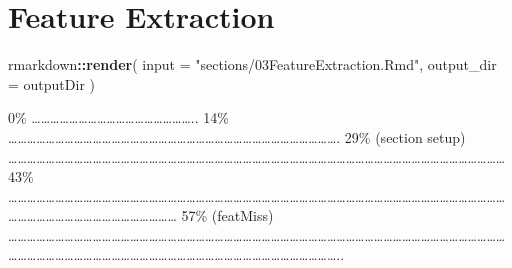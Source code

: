\documentclass[
]{article}
\newenvironment{Shaded}{\begin{snugshade}}{\end{snugshade}}
\newcommand{\AttributeTok}[1]{\textcolor[rgb]{0.13,0.29,0.53}{#1}}
\newcommand{\FunctionTok}[1]{\textcolor[rgb]{0.13,0.29,0.53}{\textbf{#1}}}
\newcommand{\NormalTok}[1]{#1}
\newcommand{\SpecialCharTok}[1]{\textcolor[rgb]{0.81,0.36,0.00}{\textbf{#1}}}
\newcommand{\StringTok}[1]{\textcolor[rgb]{0.31,0.60,0.02}{#1}}
\begin{document}
\hypertarget{feature-extraction}{%
\section{Feature Extraction}\label{feature-extraction}}

\begin{Shaded}
\begin{Highlighting}[]
\NormalTok{rmarkdown}\SpecialCharTok{::}\FunctionTok{render}\NormalTok{(}
  \AttributeTok{input =} \StringTok{"sections/03FeatureExtraction.Rmd"}\NormalTok{,}
  \AttributeTok{output\_dir =}\NormalTok{ outputDir}
\NormalTok{)}
\end{Highlighting}
\end{Shaded}

\textbar{} \textbar{} \textbar{} 0\% \textbar{}
\textbar\ldots\ldots\ldots\ldots\ldots\ldots\ldots\ldots\ldots\ldots\ldots\ldots\ldots\ldots\ldots\ldots\ldots..
\textbar{} 14\% \textbar{}
\textbar\ldots\ldots\ldots\ldots\ldots\ldots\ldots\ldots\ldots\ldots\ldots\ldots\ldots\ldots\ldots\ldots\ldots\ldots\ldots\ldots\ldots\ldots\ldots\ldots\ldots\ldots\ldots\ldots\ldots\ldots\ldots\ldots\ldots\ldots\ldots.
\textbar{} 29\% (section setup) \textbar{}
\textbar\ldots\ldots\ldots\ldots\ldots\ldots\ldots\ldots\ldots\ldots\ldots\ldots\ldots\ldots\ldots\ldots\ldots\ldots\ldots\ldots\ldots\ldots\ldots\ldots\ldots\ldots\ldots\ldots\ldots\ldots\ldots\ldots\ldots\ldots\ldots\ldots\ldots\ldots\ldots\ldots\ldots\ldots\ldots\ldots\ldots\ldots\ldots\ldots\ldots\ldots\ldots\ldots\ldots{}
\textbar{} 43\% \textbar{}
\textbar\ldots\ldots\ldots\ldots\ldots\ldots\ldots\ldots\ldots\ldots\ldots\ldots\ldots\ldots\ldots\ldots\ldots\ldots\ldots\ldots\ldots\ldots\ldots\ldots\ldots\ldots\ldots\ldots\ldots\ldots\ldots\ldots\ldots\ldots\ldots\ldots\ldots\ldots\ldots\ldots\ldots\ldots\ldots\ldots\ldots\ldots\ldots\ldots\ldots\ldots\ldots\ldots\ldots\ldots\ldots\ldots\ldots\ldots\ldots\ldots\ldots\ldots\ldots\ldots\ldots\ldots\ldots\ldots\ldots\ldots\ldots{}
\textbar{} 57\% (featMiss) \textbar{}
\textbar\ldots\ldots\ldots\ldots\ldots\ldots\ldots\ldots\ldots\ldots\ldots\ldots\ldots\ldots\ldots\ldots\ldots\ldots\ldots\ldots\ldots\ldots\ldots\ldots\ldots\ldots\ldots\ldots\ldots\ldots\ldots\ldots\ldots\ldots\ldots\ldots\ldots\ldots\ldots\ldots\ldots\ldots\ldots\ldots\ldots\ldots\ldots\ldots\ldots\ldots\ldots\ldots\ldots\ldots\ldots\ldots\ldots\ldots\ldots\ldots\ldots\ldots\ldots\ldots\ldots\ldots\ldots\ldots\ldots\ldots\ldots\ldots\ldots\ldots\ldots\ldots\ldots\ldots\ldots\ldots\ldots\ldots\ldots\ldots\ldots\ldots\ldots\ldots..
\end{document}

